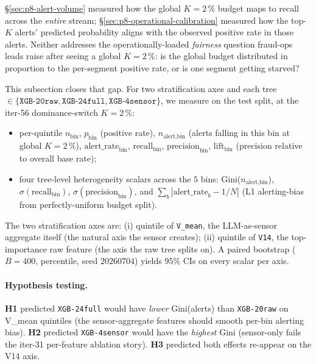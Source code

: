 \S\ref{sec:p8-alert-volume} measured how the global $K{=}2\,\%$ budget
maps to recall across the \emph{entire} stream;
\S\ref{sec:p8-operational-calibration} measured how the top-$K$ alerts'
predicted probability aligns with the observed positive rate in those
alerts. Neither addresses the operationally-loaded
\emph{fairness} question fraud-ops leads raise after seeing a global
$K{=}2\,\%$: is the global budget distributed in proportion to the
per-segment positive rate, or is one segment getting starved?

This subsection closes that gap. For two stratification axes and each
tree $\in \{\texttt{XGB-20raw}, \texttt{XGB-24full},
\texttt{XGB-4sensor}\}$, we measure on the test split, at the
iter-56 dominance-switch $K{=}2\,\%$:

\begin{itemize}
\item per-quintile $n_{\text{bin}}$, $p_{\text{bin}}$ (positive rate),
$n_{\text{alert},\text{bin}}$ (alerts falling in this bin at global
$K{=}2\,\%$), $\text{alert\_rate}_{\text{bin}}$, $\text{recall}_{\text{bin}}$,
$\text{precision}_{\text{bin}}$, $\text{lift}_{\text{bin}}$ (precision
relative to overall base rate);
\item four tree-level heterogeneity scalars across the $5$ bins:
Gini($n_{\text{alert},\text{bin}}$), $\sigma(\text{recall}_{\text{bin}})$,
$\sigma(\text{precision}_{\text{bin}})$, and $\sum_b |\text{alert\_rate}_b
- 1/N|$ (L1 alerting-bias from perfectly-uniform budget split).
\end{itemize}

The two stratification axes are: (i) quintile of \texttt{V\_mean}, the
LLM-as-sensor aggregate itself (the natural axis the sensor creates);
(ii) quintile of \texttt{V14}, the top-importance raw feature (the axis
the raw tree splits on). A paired bootstrap ($B{=}400$, percentile,
seed $20260704$) yields $95\%$ CIs on every scalar per axis.

\paragraph{Hypothesis testing.}
\textbf{H1} predicted \texttt{XGB-24full} would have \emph{lower}
Gini(alerts) than \texttt{XGB-20raw} on V\_mean quintiles
(the sensor-aggregate features should smooth per-bin alerting bias).
\textbf{H2} predicted \texttt{XGB-4sensor} would have the
\emph{highest} Gini (sensor-only fails the iter-31 per-feature ablation
story). \textbf{H3} predicted both effects re-appear on
the V14 axis.

